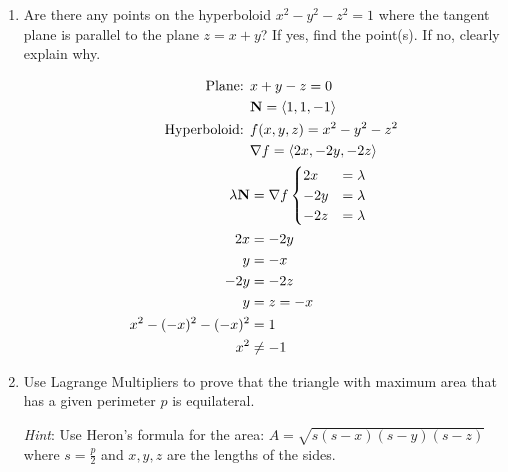 \documentclass[11pt]{article}
\renewcommand{\vec}[1]{\ensuremath\mathbf{#1}}
\begin{document}
\begin{enumerate}
\item Are there any points on the hyperboloid \(x^2 - y^2 - z^2 = 1\) where
  the tangent plane is parallel to the plane \(z = x + y\)? If yes, find
  the point(s). If no, clearly explain why.

  \begin{align*}
    \text{Plane: }& x + y - z = 0 \\
                  &\vec{N} = \left< 1, 1, -1 \right> \\
    \text{Hyperboloid: }& f(x, y, z) = x^2 - y^2 - z^2 \\
                  &\nabla f = \left< 2x, -2y, -2z \right> \\
    \lambda\vec{N} &= \nabla f
                     \begin{cases}
                       2x &= \lambda \\
                       -2y &= \lambda \\
                       -2z &= \lambda
                     \end{cases} \\
    2x &= -2y \\
    y &= -x \\
    -2y &= -2z \\
    y &= z = -x \\
    x^2 - (-x)^2 - (-x)^2 &= 1 \\
    x^2 &\neq -1
  \end{align*}

\item Use Lagrange Multipliers to prove that the triangle with maximum area that
  has a given perimeter \(p\) is equilateral.

  \textit{Hint}: Use Heron's formula for the area:
  \(A = \sqrt{s(s - x)(s - y)(s - z)}\) where \(s = \frac{p}{2}\) and
  \(x, y, z\) are the lengths of the sides.


\end{enumerate}
\end{document}
